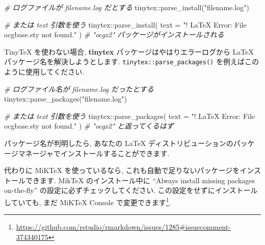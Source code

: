 \documentclass[
  11pt,
  lualatex,ja=standard,jafont=noto]{bxjsreport}
\newenvironment{Shaded}{\begin{snugshade}}{\end{snugshade}}
\newcommand{\AttributeTok}[1]{\textcolor[rgb]{0.77,0.63,0.00}{#1}}
\newcommand{\CommentTok}[1]{\textcolor[rgb]{0.56,0.35,0.01}{\textit{#1}}}
\newcommand{\FunctionTok}[1]{\textcolor[rgb]{0.00,0.00,0.00}{#1}}
\newcommand{\NormalTok}[1]{#1}
\newcommand{\SpecialCharTok}[1]{\textcolor[rgb]{0.00,0.00,0.00}{#1}}
\newcommand{\StringTok}[1]{\textcolor[rgb]{0.31,0.60,0.02}{#1}}
\renewcommand{\href}[2]{#2\footnote{\url{#1}}}
\begin{document}
\begin{Shaded}
\begin{Highlighting}[numbers=left,,]
\CommentTok{\# ログファイルが filename.log だとする}
\NormalTok{tinytex}\SpecialCharTok{::}\FunctionTok{parse\_install}\NormalTok{(}\StringTok{"filename.log"}\NormalTok{)}

\CommentTok{\# または \textasciigrave{}text\textasciigrave{} 引数を使う}
\NormalTok{tinytex}\SpecialCharTok{::}\FunctionTok{parse\_install}\NormalTok{(}
  \AttributeTok{text =} \StringTok{"! LaTeX Error: File \textasciigrave{}ocgbase.sty\textquotesingle{} not found."}
\NormalTok{)}
\CommentTok{\# "ocgx2" パッケージがインストールされる}
\end{Highlighting}
\end{Shaded}

TinyTeX を使わない場合, \textbf{tinytex} パッケージはやはりエラーログから LaTeX パッケージ名を解決しようとします. \texttt{tinytex::parse\_packages()} を例えばこのように使用してください.

\begin{Shaded}
\begin{Highlighting}[numbers=left,,]
\CommentTok{\# ログファイル名が filename.log だったとする}
\NormalTok{tinytex}\SpecialCharTok{::}\FunctionTok{parse\_packages}\NormalTok{(}\StringTok{"filename.log"}\NormalTok{)}

\CommentTok{\# または \textasciigrave{}text\textasciigrave{} 引数を使う}
\NormalTok{tinytex}\SpecialCharTok{::}\FunctionTok{parse\_packages}\NormalTok{(}
  \AttributeTok{text =} \StringTok{"! LaTeX Error: File \textasciigrave{}ocgbase.sty\textquotesingle{} not found."}
\NormalTok{)}
\CommentTok{\# "ocgx2" と返ってくるはず}
\end{Highlighting}
\end{Shaded}

パッケージ名が判明したら, あなたの LaTeX ディストリビューションのパッケージマネージャでインストールすることができます.

代わりに MiKTeX を使っているなら, これも自動で足りないパッケージをインストールできます. MikTeX のインストール中に ``Always install missing packages on-the-fly'' の設定に必ずチェックしてください. この設定をせずにインストールしていても, \href{https://github.com/rstudio/rmarkdown/issues/1285\#issuecomment-374340175}{まだ MiKTeX Console で変更できます}.
\end{document}
